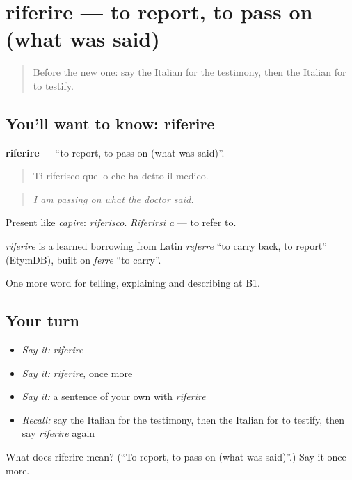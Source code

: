 \section[riferire]{riferire — to report, to pass on (what was said)}

\label{lesson:IT-C284-riferire}



\begin{quote}
Before the new one: say the Italian for the testimony, then the Italian for to testify.
\end{quote}

\subsection*{You'll want to know: riferire}
\textbf{riferire} — \textquotedblleft{}to report, to pass on (what was said)\textquotedblright{}.

\begin{quote}
Ti riferisco quello che ha detto il medico.
\end{quote}

\begin{quote}
\emph{I am passing on what the doctor said.}
\end{quote}

Present like \emph{capire}: \emph{riferisco}. \emph{Riferirsi a} — to refer to.

\begin{cousinweb}
\emph{riferire} is a learned borrowing from Latin \emph{referre} \textquotedblleft{}to carry back, to report\textquotedblright{} (EtymDB), built on \emph{ferre} \textquotedblleft{}to carry\textquotedblright{}.
\end{cousinweb}

\begin{grammarlens}[title={What you've built}]
One more word for telling, explaining and describing at B1.
\end{grammarlens}

\subsection*{Your turn}
\begin{itemize}
\raggedright
  \item \emph{Say it:} \emph{riferire}
  \item \emph{Say it:} \emph{riferire}, once more
  \item \emph{Say it:} a sentence of your own with \emph{riferire}
  \item \emph{Recall:} say the Italian for the testimony, then the Italian for to testify, then say \emph{riferire} again
\end{itemize}

\begin{tcolorbox}[breakable,colback=teal!4,colframe=teal!35!black,title={Before you move on}]
What does riferire mean? (\textquotedblleft{}To report, to pass on (what was said)\textquotedblright{}.) Say it once more.
\end{tcolorbox}

